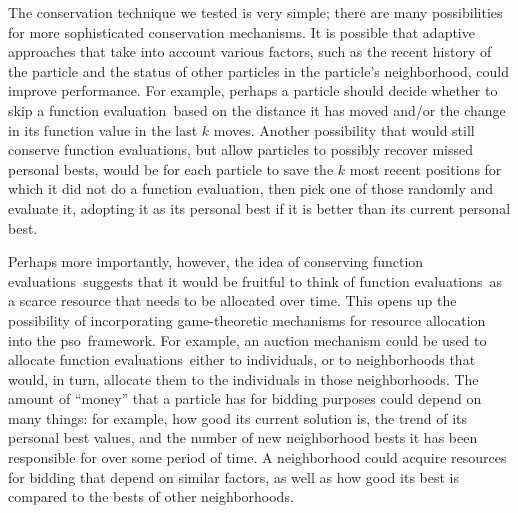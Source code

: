 \documentclass[a4paper,twoside]{article}
\newcommand{\fnceval}{function evaluation}
\newcommand{\fncevals}{function evaluations}
\newcommand{\pso}{{\sc pso}}
\begin{document}
The conservation technique we tested is very simple; there are many possibilities for more sophisticated conservation mechanisms.  It is possible that adaptive approaches that take into account various factors, such as the recent history of the particle and the status of other particles in the particle's neighborhood, could improve performance.  For example, perhaps a particle should decide whether to skip a \fnceval\ based on the distance it has moved and/or the change in its function value in the last $k$ moves.  
Another possibility that would still conserve function evaluations, but allow particles to possibly recover missed personal bests, would be for each particle to save the $k$ most recent positions for which it did not do a function evaluation, then pick one of those randomly and evaluate it, adopting it as its personal best if it is better than its current personal best.


Perhaps more importantly, however, the idea of conserving \fncevals\ suggests that it would be fruitful to think of \fncevals\ as a scarce resource that needs to be allocated over time.  This opens up the possibility  of incorporating game-theoretic mechanisms for resource allocation into the \pso\ framework.  For example, an auction mechanism could be used to allocate \fncevals\ either to individuals, or to  neighborhoods that would, in turn, allocate them to the individuals in those neighborhoods. The amount of ``money'' that a particle has for bidding purposes could depend on many things:  for example, how good its current solution is, the trend of its personal best values, and the number of new neighborhood bests it has been responsible for over some period of time. A neighborhood could acquire resources for bidding that depend on similar factors, as well as how good its best is compared to the bests of other neighborhoods.  







{\small }
\end{document}
